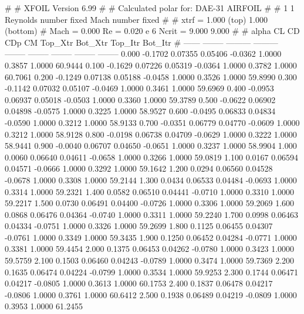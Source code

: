 #  
#       XFOIL         Version 6.99
#  
# Calculated polar for: DAE-31 AIRFOIL                                  
#  
# 1 1 Reynolds number fixed          Mach number fixed         
#  
# xtrf =   1.000 (top)        1.000 (bottom)  
# Mach =   0.000     Re =     0.020 e 6     Ncrit =   9.000  9.000
#  
#   alpha    CL        CD       CDp       CM     Top_Xtr  Bot_Xtr  Top_Itr  Bot_Itr
#  ------ -------- --------- --------- -------- -------- -------- -------- --------
   0.000  -0.1702   0.07355   0.05406  -0.0362   1.0000   0.3857   1.0000  60.9444
   0.100  -0.1629   0.07226   0.05319  -0.0364   1.0000   0.3782   1.0000  60.7061
   0.200  -0.1249   0.07138   0.05188  -0.0458   1.0000   0.3526   1.0000  59.8990
   0.300  -0.1142   0.07032   0.05107  -0.0469   1.0000   0.3461   1.0000  59.6969
   0.400  -0.0953   0.06937   0.05018  -0.0503   1.0000   0.3360   1.0000  59.3789
   0.500  -0.0622   0.06902   0.04898  -0.0575   1.0000   0.3225   1.0000  58.9527
   0.600  -0.0495   0.06833   0.04834  -0.0590   1.0000   0.3212   1.0000  58.9133
   0.700  -0.0351   0.06779   0.04770  -0.0609   1.0000   0.3212   1.0000  58.9128
   0.800  -0.0198   0.06738   0.04709  -0.0629   1.0000   0.3222   1.0000  58.9441
   0.900  -0.0040   0.06707   0.04650  -0.0651   1.0000   0.3237   1.0000  58.9904
   1.000   0.0060   0.06640   0.04611  -0.0658   1.0000   0.3266   1.0000  59.0819
   1.100   0.0167   0.06594   0.04571  -0.0666   1.0000   0.3292   1.0000  59.1642
   1.200   0.0294   0.06560   0.04528  -0.0678   1.0000   0.3308   1.0000  59.2144
   1.300   0.0434   0.06533   0.04484  -0.0693   1.0000   0.3314   1.0000  59.2321
   1.400   0.0582   0.06510   0.04441  -0.0710   1.0000   0.3310   1.0000  59.2217
   1.500   0.0730   0.06491   0.04400  -0.0726   1.0000   0.3306   1.0000  59.2069
   1.600   0.0868   0.06476   0.04364  -0.0740   1.0000   0.3311   1.0000  59.2240
   1.700   0.0998   0.06463   0.04334  -0.0751   1.0000   0.3326   1.0000  59.2699
   1.800   0.1125   0.06455   0.04307  -0.0761   1.0000   0.3349   1.0000  59.3435
   1.900   0.1250   0.06452   0.04284  -0.0771   1.0000   0.3381   1.0000  59.4454
   2.000   0.1375   0.06453   0.04262  -0.0780   1.0000   0.3423   1.0000  59.5759
   2.100   0.1503   0.06460   0.04243  -0.0789   1.0000   0.3474   1.0000  59.7369
   2.200   0.1635   0.06474   0.04224  -0.0799   1.0000   0.3534   1.0000  59.9253
   2.300   0.1744   0.06471   0.04217  -0.0805   1.0000   0.3613   1.0000  60.1753
   2.400   0.1837   0.06478   0.04217  -0.0806   1.0000   0.3761   1.0000  60.6412
   2.500   0.1938   0.06489   0.04219  -0.0809   1.0000   0.3953   1.0000  61.2455

